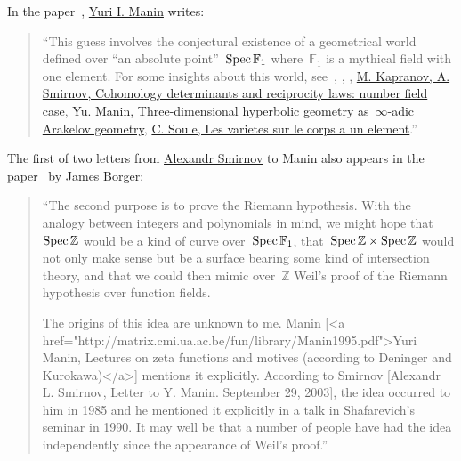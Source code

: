 In the paper~\cite{the-notion-of-dimension-in-geometry-and-algebra}, \href{http://en.wikipedia.org/wiki/Yuri_I._Manin}{Yuri I. Manin} writes:

\begin{quote}
  ``This guess involves the conjectural existence of a geometrical world defined over ``an absolute point''~$\operatorname{Spec}\mathbb{F}_1$ where~$\mathbb{F}_1$ is a mythical field with one element. For some insights about this world, see~\cite{sur-les-analogues-algebriques-des-groupes-semi-simples-complexes}, \cite{hurwitz-inequalities-for-number-fields}, \cite{letters-to-manin}, \href{http://matrix.cmi.ua.ac.be/fun/library/KapranovSmirnov.pdf}{M. Kapranov, A. Smirnov, Cohomology determinants and reciprocity laws: number field case}, \href{http://matrix.cmi.ua.ac.be/ngeometry/library/Manin1991.pdf}{Yu. Manin, Three-dimensional hyperbolic geometry as~$\infty$\nobreakdash-adic Arakelov geometry}, \href{http://matrix.cmi.ua.ac.be/fun/library/Soule2004.pdf}{C. Soule, Les varietes sur le corps a un element}.''
\end{quote}

The first of two letters from \href{http://www.pdmi.ras.ru/eng/perso/smirnov.php}{Alexandr Smirnov} to Manin also appears in the paper~\cite{lambda-rings-and-the-field-with-one-element} by \href{http://maths.anu.edu.au/~borger/}{James Borger}:

\begin{quote}
  ``The second purpose is to prove the Riemann hypothesis. With the analogy between integers and polynomials in mind, we might hope that~$\operatorname{Spec}\mathbb{Z}$ would be a kind of curve over~$\operatorname{Spec}\mathbb{F}_1$, that~$\operatorname{Spec}\mathbb{Z}\times\operatorname{Spec}\mathbb{Z}$ would not only make sense but be a surface bearing some kind of intersection theory, and that we could then mimic over~$\mathbb{Z}$ Weil's proof of the Riemann hypothesis over function fields.
  
  The origins of this idea are unknown to me. Manin [<a href="http://matrix.cmi.ua.ac.be/fun/library/Manin1995.pdf">Yuri Manin, Lectures on zeta functions and motives (according to Deninger and Kurokawa)</a>] mentions it explicitly. According to Smirnov [Alexandr L. Smirnov, Letter to Y. Manin. September 29, 2003], the idea occurred to him in 1985 and he mentioned it explicitly in a talk in Shafarevich’s seminar in 1990. It may well be that a number of people have had the idea independently since the appearance of Weil’s proof.''
\end{quote}

